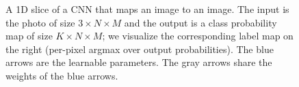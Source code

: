 \begin{figure}
{
    }
    \caption{A 1D slice of a CNN that maps an image to an image. The input is the photo of size $3 \times N \times M$ and the output is a class probability map of size $K \times N \times M$; we visualize the corresponding label map on the right (per-pixel argmax over output probabilities). The blue arrows are the learnable parameters. The gray arrows share the weights of the blue arrows.}
    \label{fig:convolutional_neural_networks:image_to_image_arch}
\end{figure}

